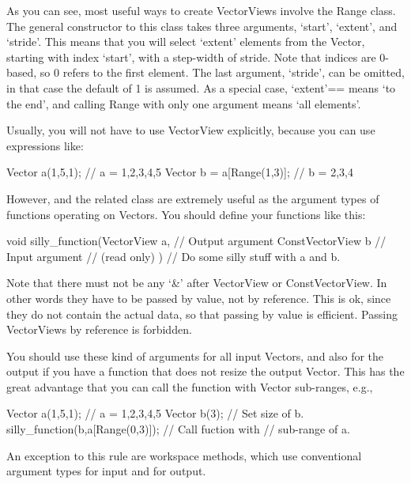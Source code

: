 As you can see, most useful ways to create VectorViews involve the
Range class. The general constructor to this class takes three
arguments, `start', `extent', and `stride'. This means that you will
select `extent' elements from the Vector, starting with index `start',
with a step-width of stride. Note that indices are 0-based, so 0
refers to the first element. The last argument, `stride', can be
omitted, in that case the default of 1 is assumed. As a special case,
`extent'== means `to the end', and calling Range with only one
argument  means `all elements'.

Usually, you will not have to use VectorView explicitly, because you
can use expressions like:

\begin{code}
Vector a(1,5,1);                // a = 1,2,3,4,5
Vector b = a[Range(1,3)];       // b = 2,3,4
\end{code}

However,  and the related class
 are extremely useful as the argument types of
functions operating on Vectors. You should define your functions like
this:

\begin{code}
void silly_function(VectorView a,      // Output argument
                    ConstVectorView b  // Input argument
                                       // (read only)
                   )
{
   // Do some silly stuff with a and b.
}
\end{code}

Note that there must not be any `\&' after VectorView or
ConstVectorView. In other words they have to be passed by value, not
by reference. This is ok, since they do not contain the actual
data, so that passing by value is efficient. Passing VectorViews by
reference is forbidden.

You should use these kind of arguments for all input Vectors, and also
for the output if you have a function that does not resize the output
Vector. This has the great advantage that you can call the function
with Vector sub-ranges, e.g., 
\begin{code}
Vector a(1,5,1);                  // a = 1,2,3,4,5
Vector b(3);                      // Set size of b.
silly_function(b,a[Range(0,3)]);  // Call fuction with
                                  // sub-range of a.
\end{code}

An exception to this rule are workspace methods, which use
conventional argument types  for input and
 for output.

